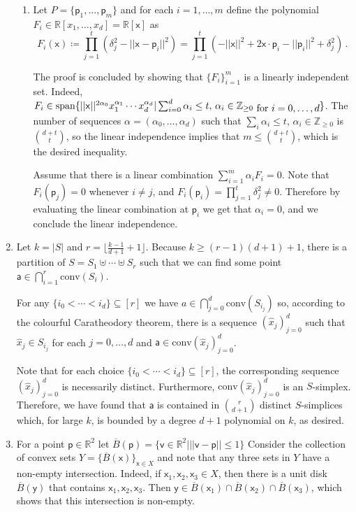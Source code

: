 \documentclass[kulak]{tplt}
\theoremstyle{definition}
\newcommand{\R}{\mathbb{R}}
\newcommand{\Z}{\mathbb{Z}}
\newcommand{\vv}{\mathsf{v}}
\newcommand{\vx}{\mathsf{x}}
\newcommand{\vy}{\mathsf{y}}
\newcommand{\va}{\mathsf{a}}
\newcommand{\vp}{\mathsf{p}}
\newcommand{\spn}{\mathrm{span}}
\newcommand{\conv}{\mathrm{conv}}
\begin{document}
\begin{enumerate}
\begin{enumerate}
\item 
Let $P = \{\vp_1, \ldots, \vp_m \} $ and for each $i=1, \ldots, m$ define the polynomial $F_i \in \R[x_1, \ldots, x_d] = \R[\vx]$ as
$$ F_i ( \vx ) \coloneqq \prod_{j=1}^t \left( \delta_j^2 - ||\vx - \vp_i ||^2\right)  =  \prod_{j=1}^t \left(  - ||\vx ||^2 + 2 \vx \cdot \vp_i - ||\vp_i||^2 + \delta_j^2\right) \, .$$


The proof is concluded by showing that $\{F_i\}_{i=1}^m$ is a linearly independent set.
Indeed, $F_i \in \spn \{ ||\vx||^{2\alpha_0} x_1^{\alpha_1} \cdots x_d^{\alpha_d} | \sum_{i=0}^d \alpha_i \leq t, \, \alpha_i\in \Z_{\geq 0 } \txt{ for $i = 0 , \ldots, d $ }\}$.
The number of sequences $\alpha = (\alpha_0, \ldots, \alpha_d)$ such that $ \sum_i \alpha_i \leq t, \, \alpha_i\in \Z_{\geq 0 }$ is $\binom{d+t}{t}$, so the linear independence implies that $m \leq \binom{d+t}{t}$, which is the desired inequality.

Assume that there is a linear combination $ \sum_{i=1}^m \alpha_i F_i = 0 $.
Note that $F_i(\vp_j ) = 0$ whenever $i \neq j$, and $F_i(\vp_i ) = \prod_{j=1}^t \delta_j^2 \neq 0$.
Therefore by evaluating the linear combination at $\vp_i $ we get that $\alpha_i =0$, and we conclude the linear independence.
\end{enumerate}

\item 
Let $k = |S|$ and $r = \lfloor \frac{k-1}{d+1} + 1 \rfloor$.
Because $k \geq (r-1)(d+1) + 1$, there is a partition of $S = S_1 \uplus \cdots \uplus S_r$ such that we can find some point $\va \in \bigcap_{i=1}^r \conv (S_i)$.

For any $\{i_0 < \cdots < i_d\} \subseteq [r]$ we have $a \in \bigcap_{j=0}^d \conv (S_{i_j})$ so, according to the colourful Caratheodory theorem, there is a sequence $(\hat{x}_j)_{j=0}^d$ such that $\hat{x}_j\in S_{i_j} $ for each $j = 0, \ldots, d$ and $\va \in \conv (\hat{x}_j)_{j=0}^d$.

Note that for each choice $\{i_0 < \cdots < i_d\} \subseteq [r]$, the corresponding sequence $(\hat{x}_j)_{j=0}^d$ is necessarily distinct.
Furthermore, $\conv (\hat{x}_j)_{j=0}^d $ is an $S$-simplex.
Therefore, we have found that $\va $ is contained in $\binom{r}{d+1}$ distinct $S$-simplices which, for large $k$, is bounded by a degree $d+1$ polynomial on $k$, as desired.

\item 
For a point $\vp \in \R^2$ let $\overline{B}(\vp) = \{ \vv \in \R^2 | ||\vv - \vp|| \leq 1 \}$
Consider the collection of convex sets $Y = \{\overline{B}(\vx)\}_{\vx \in X}$ and note that any three sets in $Y$ have a non-empty intersection.
Indeed, if $\vx_1, \vx_2, \vx_3 \in X$, then there is a unit disk $\overline{B}(\vy)$ that contains $\vx_1, \vx_2, \vx_3$.
Then $\vy \in \overline{B}(\vx_1)\cap \overline{B}(\vx_2) \cap \overline{B}(\vx_3)$, which shows that this intersection is non-empty.


\end{enumerate}
\end{document}
